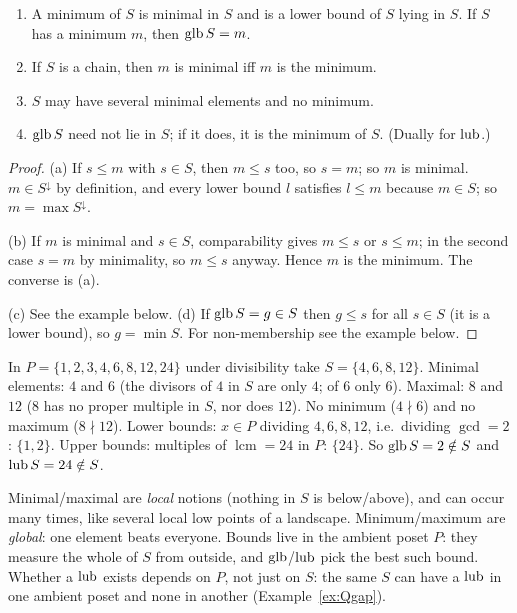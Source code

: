\begin{proposition}\label{prop:extremal-rel}
	\begin{enumerate}[label=(\alph*)]
		\item A minimum of $S$ is minimal in $S$ and is a lower bound of $S$ lying in $S$. If $S$ has a minimum $m$, then $\operatorname{glb} S=m$.
		\item If $S$ is a chain, then $m$ is minimal iff $m$ is the minimum.
		\item $S$ may have several minimal elements and no minimum.
		\item $\operatorname{glb} S$ need not lie in $S$; if it does, it is the minimum of $S$. (Dually for $\operatorname{lub}$.)
	\end{enumerate}
\end{proposition}
\begin{proof}
	(a) If $s\le m$ with $s\in S$, then $m\le s$ too, so $s=m$; so $m$ is minimal. $m\in S^\downarrow$ by definition, and every lower bound $l$ satisfies $l\le m$ because $m\in S$; so $m=\max S^\downarrow$.
	
	(b) If $m$ is minimal and $s\in S$, comparability gives $m\le s$ or $s\le m$; in the second case $s=m$ by minimality, so $m\le s$ anyway. Hence $m$ is the minimum. The converse is (a).
	
	(c) See the example below. (d) If $\operatorname{glb} S=g\in S$ then $g\le s$ for all $s\in S$ (it is a lower bound), so $g=\min S$. For non-membership see the example below.
\end{proof}

\begin{example}\label{ex:divsub}
	In $P=\{1,2,3,4,6,8,12,24\}$ under divisibility take $S=\{4,6,8,12\}$. Minimal elements: $4$ and $6$ (the divisors of $4$ in $S$ are only $4$; of $6$ only $6$). Maximal: $8$ and $12$ ($8$ has no proper multiple in $S$, nor does $12$). No minimum ($4\nmid6$) and no maximum ($8\nmid12$). Lower bounds: $x\in P$ dividing $4,6,8,12$, i.e.\ dividing $\gcd=2$: $\{1,2\}$. Upper bounds: multiples of $\operatorname{lcm}=24$ in $P$: $\{24\}$. So $\operatorname{glb} S=2\notin S$ and $\operatorname{lub} S=24\notin S$.
\end{example}

\begin{intuition}
	Minimal/maximal are \emph{local} notions (nothing in $S$ is below/above), and can occur many times, like several local low points of a landscape. Minimum/maximum are \emph{global}: one element beats everyone. Bounds live in the ambient poset $P$: they measure the whole of $S$ from outside, and $\operatorname{glb}$/$\operatorname{lub}$ pick the best such bound. Whether a $\operatorname{lub}$ exists depends on $P$, not just on $S$: the same $S$ can have a $\operatorname{lub}$ in one ambient poset and none in another (Example~\ref{ex:Qgap}).
\end{intuition}

